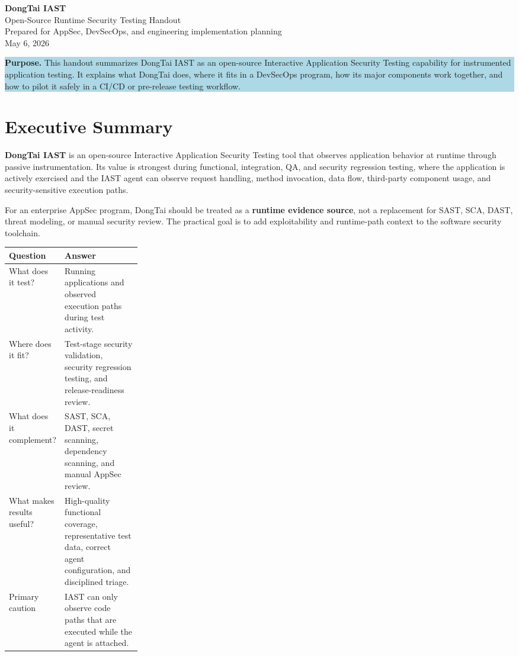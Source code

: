 \documentclass[11pt]{article}
\newcommand{\keyterm}[1]{\textbf{\color{HeadingBlue}#1}}
\begin{document}
\begin{center}
  {\Huge\bfseries\color{HeadingBlue} DongTai IAST}\\[4pt]
  {\Large Open-Source Runtime Security Testing Handout}\\[8pt]
  {\normalsize Prepared for AppSec, DevSecOps, and engineering implementation planning}\\[4pt]
  {\normalsize May 6, 2026}
\end{center}

\vspace{0.3em}
\colorbox{LightBlue}{%
\begin{minipage}{0.97\linewidth}
\textbf{Purpose.} This handout summarizes DongTai IAST as an open-source Interactive Application Security Testing capability for instrumented application testing. It explains what DongTai does, where it fits in a DevSecOps program, how its major components work together, and how to pilot it safely in a CI/CD or pre-release testing workflow.
\end{minipage}}

\section{Executive Summary}

\keyterm{DongTai IAST} is an open-source Interactive Application Security Testing tool that observes application behavior at runtime through passive instrumentation. Its value is strongest during functional, integration, QA, and security regression testing, where the application is actively exercised and the IAST agent can observe request handling, method invocation, data flow, third-party component usage, and security-sensitive execution paths.

For an enterprise AppSec program, DongTai should be treated as a \keyterm{runtime evidence source}, not a replacement for SAST, SCA, DAST, threat modeling, or manual security review. The practical goal is to add exploitability and runtime-path context to the software security toolchain.

\begin{center}
\begin{tabularx}{0.96\linewidth}{L{0.26\linewidth}Y}
\toprule
\textbf{Question} & \textbf{Answer} \\
\midrule
What does it test? & Running applications and observed execution paths during test activity. \\
Where does it fit? & Test-stage security validation, security regression testing, and release-readiness review. \\
What does it complement? & SAST, SCA, DAST, secret scanning, dependency scanning, and manual AppSec review. \\
What makes results useful? & High-quality functional coverage, representative test data, correct agent configuration, and disciplined triage. \\
Primary caution & IAST can only observe code paths that are executed while the agent is attached. \\
\bottomrule
\end{tabularx}
\end{center}
\end{document}

